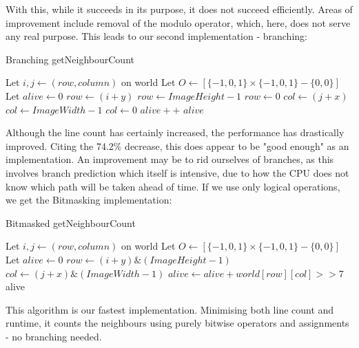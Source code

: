 \documentclass[twoside,twocolumn]{article}
\begin{document}
With this, while it succeeds in its purpose, it does not
succeed efficiently. Areas of improvement include removal of the modulo operator, which, here,
does not serve any real purpose. This leads to our second implementation - branching:

\begin{algorithm}
  \caption{Branching getNeighbourCount}
  \begin{algorithmic}
    \State Let $i, j \gets (row, column)$ on world
  \State Let $O \gets [\{-1,0,1\} \times \{-1, 0, 1\} - \{0,0\}]$
  \State Let $alive \gets 0$   
      \State $row \gets (i + y)$
        \State $row \gets ImageHeight-1$
        \State $row \gets 0$
      \EndIf
      \State $col \gets (j + x)$
        \State $col \gets ImageWidth - 1$
          \State $col \gets 0$
      \EndIf
      \State $alive++$
      \EndIf
    \EndFor
    \State \Return $alive$
  \end{algorithmic}
\end{algorithm}
Although the line count has certainly increased, the performance has drastically improved. Citing the 
74.2\% decrease, this does appear to be "good enough" as an implementation. An improvement may be to rid 
ourselves of branches, as this involves branch prediction which itself is intensive, due to how the CPU 
does not know which path will be taken ahead of time. If we use only logical operations,
we get the Bitmasking implementation:
\begin{algorithm}
  \caption{Bitmasked getNeighbourCount}
  \begin{algorithmic}
    \State Let $i, j \gets (row, column)$ on world
  \State Let $O \gets [\{-1,0,1\} \times \{-1, 0, 1\} - \{0,0\}]$
  \State Let $alive \gets 0$   
      \State $row \gets (i + y) \& (ImageHeight - 1)$
      \State $col \gets (j + x) \& (ImageWidth - 1)$
      \State $alive \gets alive + world[row][col] >> 7$
    \EndFor
    \State \Return alive
  \end{algorithmic}
\end{algorithm}

This algorithm is our fastest implementation. Minimising both line count and runtime, it 
counts the neighbours using purely bitwise operators and assignments - no branching needed.

\end{document}
